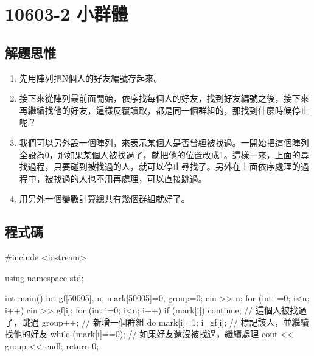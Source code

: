 \section{10603-2 小群體}

\subsection{解題思惟}
\begin{enumerate}
	\item 先用陣列把N個人的好友編號存起來。
	\item 接下來從陣列最前面開始，依序找每個人的好友，找到好友編號之後，接下來再繼續找他的好友，這樣反覆讀取，都是同一個群組的，那找到什麼時候停止呢？
	\item 我們可以另外設一個陣列，來表示某個人是否曾經被找過。一開始把這個陣列全設為0，那如果某個人被找過了，就把他的位置改成1。這樣一來，上面的尋找過程，只要碰到被找過的人，就可以停止尋找了。另外在上面依序處理的過程中，被找過的人也不用再處理，可以直接跳過。
	\item 用另外一個變數計算總共有幾個群組就好了。
\end{enumerate}

\subsection{程式碼}
\begin{cppcode}
#include <iostream>

using namespace std;

int main()
{
	int gf[50005], n, mark[50005]={0}, group=0;
	cin >> n;
	for (int i=0; i<n; i++) cin >> gf[i];
	for (int i=0; i<n; i++) {
		if (mark[i]) continue; // 這個人被找過了，跳過
		group++; // 新增一個群組
		do {
			mark[i]=1; i=gf[i]; // 標記該人，並繼續找他的好友
		} while (mark[i]==0); // 如果好友還沒被找過，繼續處理
	}
	cout << group << endl;
	return 0;
}
\end{cppcode}
